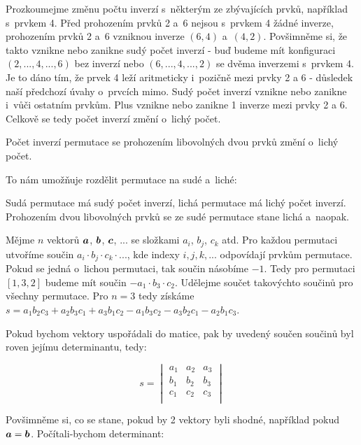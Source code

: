 Prozkoumejme změnu počtu inverzí s~některým ze zbývajících prvků, například s~prvkem 4. Před prohozením prvků 2 a~6 nejsou s~prvkem 4 žádné inverze, prohozením prvků 2 a~6 vzniknou inverze \((6, 4)\) a~\((4, 2)\). Povšimněme si, že takto vznikne nebo zanikne sudý počet inverzí - buď budeme mít konfiguraci \((2, ..., 4, ..., 6)\) bez inverzí nebo \((6, ..., 4, ..., 2)\) se dvěma inverzemi s~prvkem 4. Je to dáno tím, že prvek 4 leží aritmeticky i~pozičně mezi prvky 2 a 6 - důsledek naší předchozí úvahy o~prvcích mimo. Sudý počet inverzí vznikne nebo zanikne i~vůči ostatním prvkům. Plus vznikne nebo zanikne 1 inverze mezi prvky 2 a 6. Celkově se tedy počet inverzí změní o~lichý počet. 

\begin{fact}
Počet inverzí permutace se prohozením libovolných dvou prvků změní o~lichý počet. 
\end{fact}

To nám umožňuje rozdělit permutace na sudé a~liché:

\begin{fact}
Sudá permutace má sudý počet inverzí, lichá permutace má lichý počet inverzí. Prohozením dvou libovolných prvků se ze sudé permutace stane lichá a~naopak.
\end{fact}

Mějme \(n\) vektorů \(\boldsymbol{a}\), \(\boldsymbol{b}\), \(\boldsymbol{c}\), ... se složkami \(a_i\), \(b_j\), \(c_k\) atd. Pro každou permutaci utvoříme součin \(a_i \cdot b_j \cdot c_k \cdot ...\), kde indexy \(i, j, k, ...\) odpovídají prvkům permutace. Pokud se jedná o~lichou permutaci, tak součin násobíme \(-1\). Tedy pro permutaci \([1, 3, 2]\) budeme mít součin \(-a_1 \cdot b_3 \cdot c_2\). Udělejme součet takovýchto součinů pro všechny permutace. Pro \(n=3\) tedy získáme \(s = a_1 b_2 c_3 + a_2 b_3 c_1 + a_3 b_1 c_2 - a_1 b_3 c_2  - a_3 b_2 c_1 - a_2 b_1 c_3\).

Pokud bychom vektory uspořádali do matice, pak by uvedený součen součinů byl roven jejímu determinantu, tedy:

\begin{equation}
s = 
\begin{vmatrix}
a_1 & a_2 & a_3 \\
b_1 & b_2 & b_3 \\
c_1 & c_2 & c_3 \\
\end{vmatrix}
\end{equation}

Povšimněme si, co se stane, pokud by 2 vektory byli shodné, například pokud \(\boldsymbol{a} = \boldsymbol{b}\). Počítali-bychom determinant: 

